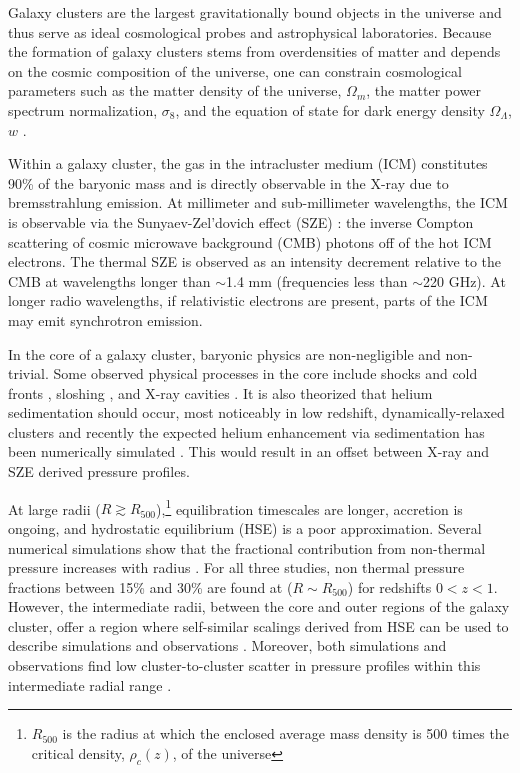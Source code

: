 Galaxy clusters are the largest gravitationally bound objects in the universe and thus serve as ideal cosmological probes 
and astrophysical laboratories. Because the formation of galaxy clusters stems from overdensities of matter
and depends on the cosmic composition of the universe, one can constrain cosmological parameters such as the matter 
density of the universe, $\Omega_m$, the matter power spectrum normalization, $\sigma_8$,
and the equation of state for dark energy density $\Omega_{\Lambda}$, $w$ \citep[e.g.][]{carlstrom2002}.

Within a galaxy cluster, the gas in the intracluster medium (ICM) constitutes 90\% of the
baryonic mass \citep{vikhlinin2006b} and is directly observable in the X-ray due to bremsstrahlung emission. 
At millimeter and sub-millimeter wavelengths, the ICM is observable via the Sunyaev-Zel'dovich effect (SZE) 
\citep{sunyaev1972}: the inverse Compton scattering of cosmic microwave background (CMB) photons off of
the hot ICM electrons. The thermal SZE is observed as an intensity decrement relative to the CMB at wavelengths longer 
than $\sim$1.4 mm (frequencies less than $\sim$220 GHz).
At longer radio wavelengths, if relativistic electrons are present, parts of the ICM may emit synchrotron emission.

In the core of a galaxy cluster, baryonic physics are non-negligible and non-trivial. Some observed
physical processes in the core include shocks and cold fronts \citep[e.g.][]{markevitch2007}, sloshing
\citep[e.g.][]{fabian2006}, and X-ray cavities \citep{mcnamara2007}. It is also theorized that helium sedimentation
should occur, most noticeably in low redshift, dynamically-relaxed clusters \citep{abramopoulos1981, gilfanov1984} 
and recently the expected helium enhancement via sedimentation has been numerically simulated \citep{peng2009}. 
This would result in an offset between X-ray and SZE derived pressure profiles.

At large radii ($R \gtrsim R_{500}$),\footnote{$R_{500}$
is the radius at which the enclosed average mass density is 500 times the critical density, 
$\rho_c(z)$, of the universe} equilibration timescales are longer, accretion is ongoing, 
and hydrostatic equilibrium (HSE) is a poor approximation. 
Several numerical simulations show that the fractional contribution
 from non-thermal pressure increases with radius \citep{shaw2010,battaglia2012,nelson2014}. 
For all three studies, non thermal pressure fractions between 15\% and 30\% are found at ($R \sim R_{500}$)
for redshifts $0 < z < 1$. However, the intermediate radii, between the core and outer regions of the 
galaxy cluster, offer a region where self-similar scalings derived from HSE can be used to describe simulations 
and observations \citep[e.g.][]{kravtsov2012}. Moreover, both simulations and observations find low
cluster-to-cluster scatter in pressure profiles within this intermediate radial range \citep[e.g.][]{borgani2004,
nagai2007,arnaud2010,bonamente2012,planck2013a,sayers2013}.

